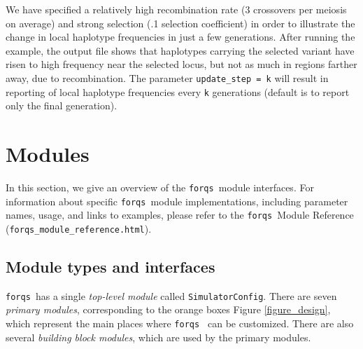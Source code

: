 \documentclass{article}
\newcommand{\forqs}[0]{\texttt{forqs }}
\newcommand{\codeinput}[1]{\begin{small}  \end{small}}
\begin{document}
We have specified a relatively high recombination rate (3 crossovers per
meiosis on average) and strong selection (.1 selection coefficient) in order to
illustrate the change in local haplotype frequencies in just a few generations.
After running the example, the output file
 shows that haplotypes carrying
the selected variant have risen to high frequency near the selected locus, but
not as much in regions farther away, due to recombination.  The parameter
\texttt{update\_step = k} will result in reporting of local haplotype
frequencies every \texttt{k} generations (default is to report only the final
generation).


\codeinput{../examples/tutorial_6_haplotype_frequencies.txt}



\newpage


\section{Modules}
\label{section_modules}




\begin{sloppypar}
In this section, we give an overview of the \forqs module interfaces.  For
information about specific \forqs module implementations, including parameter
names, usage, and links to examples, please refer to the \forqs Module
Reference (\texttt{forqs\_module\_reference.html}).
\end{sloppypar}


\subsection{Module types and interfaces}

\forqs has a single \emph{top-level module} called \texttt{SimulatorConfig}.
There are seven \emph{primary modules}, corresponding to the orange boxes
Figure \ref{figure_design}, which represent the main places where \forqs
can be customized.  There are also several \emph{building block modules},
which are used by the primary modules.
\end{document}
